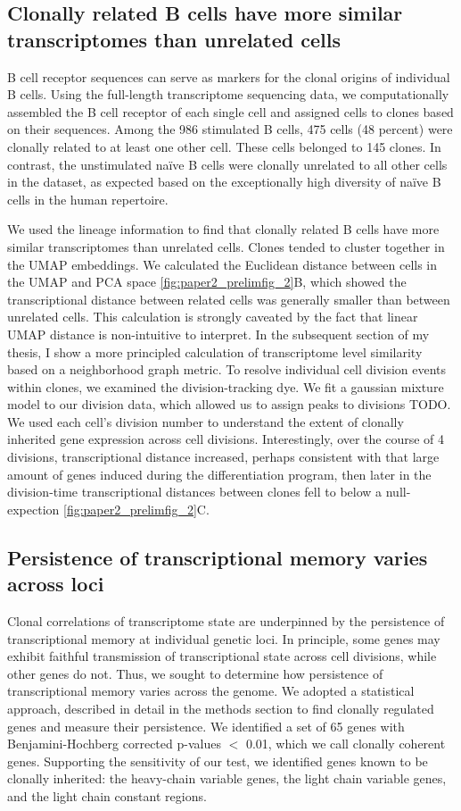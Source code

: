 \subsection{Clonally related B cells have more similar transcriptomes than unrelated cells}
B cell receptor sequences can serve as markers for the clonal origins of individual B cells. Using the full-length transcriptome sequencing data, we computationally assembled the B cell receptor of each single cell and assigned cells to clones based on their sequences. Among the 986 stimulated B cells, 475 cells (48 percent) were clonally related to at least one other cell. These cells belonged to 145 clones. In contrast, the unstimulated naïve B cells were clonally unrelated to all other cells in the dataset, as expected based on the exceptionally high diversity of naïve B cells in the human repertoire\cite{briney2019commonality}.

We used the lineage information to find that clonally related B cells have more similar transcriptomes than unrelated cells. Clones tended to cluster together in the UMAP embeddings. We calculated the Euclidean distance between cells in the UMAP and PCA space \ref{fig:paper2_prelimfig_2}B, which showed the transcriptional distance between related cells was generally smaller than between unrelated cells. This calculation is strongly caveated by the fact that linear UMAP distance is non-intuitive to interpret. In the subsequent section of my thesis, I show a more principled calculation of transcriptome level similarity based on a neighborhood graph metric. To resolve individual cell division events within clones, we examined the division-tracking dye\cite{hasbold1998cell}. We fit a gaussian mixture model to our division data, which allowed us to assign peaks to divisions TODO. We used each cell’s division number to understand the extent of clonally inherited gene expression across cell divisions. Interestingly, over the course of 4 divisions, transcriptional distance increased, perhaps consistent with that large amount of genes induced during the differentiation program, then later in the division-time transcriptional distances between clones fell to below a null-expection \ref{fig:paper2_prelimfig_2}C.  

\subsection{Persistence of transcriptional memory varies across loci}
Clonal correlations of transcriptome state are underpinned by the persistence of transcriptional memory at individual genetic loci. In principle, some genes may exhibit faithful transmission of transcriptional state across cell divisions, while other genes do not. Thus, we sought to determine how persistence of transcriptional memory varies across the genome.
We adopted a statistical approach, described in detail in the methods section to find clonally regulated genes and measure their persistence. We identified a set of 65 genes with Benjamini-Hochberg corrected p-values $<$ 0.01, which we call clonally coherent genes. Supporting the sensitivity of our test, we identified genes known to be clonally inherited: the heavy-chain variable genes, the light chain variable genes, and the light chain constant regions. 

